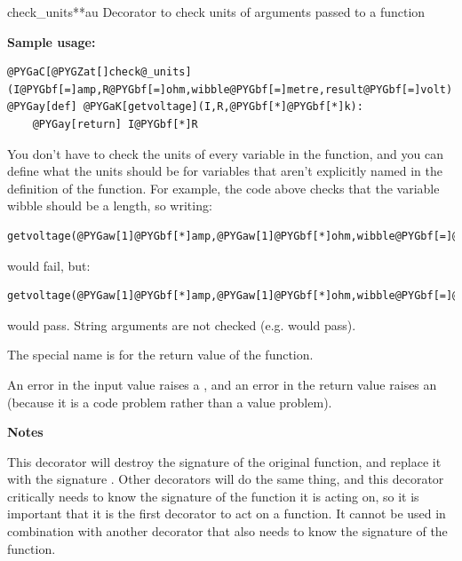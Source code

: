 \documentclass[letterpaper,10pt,english]{manual}
\begin{document}
\hypertarget{brian.check_units}{}\begin{funcdesc}{check\_units}{**au}
Decorator to check units of arguments passed to a function

\textbf{Sample usage:}

\begin{Verbatim}[commandchars=@\[\]]
@PYGaC[@PYGZat[]check@_units](I@PYGbf[=]amp,R@PYGbf[=]ohm,wibble@PYGbf[=]metre,result@PYGbf[=]volt)
@PYGay[def] @PYGaK[getvoltage](I,R,@PYGbf[*]@PYGbf[*]k):
    @PYGay[return] I@PYGbf[*]R
\end{Verbatim}

You don't have to check the units of every variable in the function, and
you can define what the units should be for variables that aren't
explicitly named in the definition of the function. For example, the code
above checks that the variable wibble should be a length, so writing:

\begin{Verbatim}[commandchars=@\[\]]
getvoltage(@PYGaw[1]@PYGbf[*]amp,@PYGaw[1]@PYGbf[*]ohm,wibble@PYGbf[=]@PYGaw[1])
\end{Verbatim}

would fail, but:

\begin{Verbatim}[commandchars=@\[\]]
getvoltage(@PYGaw[1]@PYGbf[*]amp,@PYGaw[1]@PYGbf[*]ohm,wibble@PYGbf[=]@PYGaw[1]@PYGbf[*]metre)
\end{Verbatim}

would pass.
String arguments are not checked (e.g.  would pass).

The special name  is for the return value of the function.

An error in the input value raises a \hyperlink{brian.DimensionMismatchError}{}, and an error
in the return value raises an  (because it is a code
problem rather than a value problem).

\textbf{Notes}

This decorator will destroy the signature of the original function, and
replace it with the signature . Other decorators will
do the same thing, and this decorator critically needs to know the signature
of the function it is acting on, so it is important that it is the first
decorator to act on a function. It cannot be used in combination with another
decorator that also needs to know the signature of the function.
\end{funcdesc}
\end{document}
